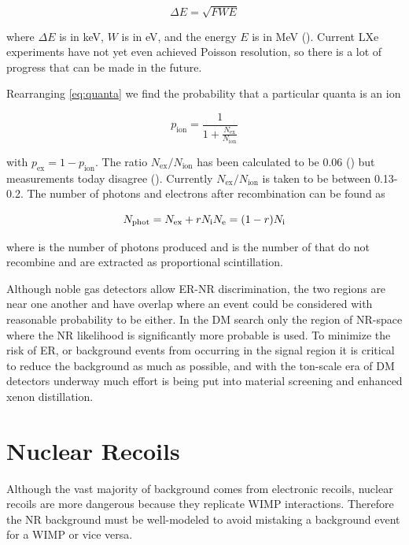 \begin{equation}
\Delta E = \sqrt{F W E}
\end{equation}

\noindent where $\Delta E$ is in keV, $W$ is in eV, and the energy $E$ is in MeV ().  Current LXe experiments have
not yet even achieved Poisson resolution, so there is a lot of progress that can be made in the future.

Rearranging \eqref{eq:quanta} we find the probability that a particular quanta is an ion

\begin{equation}
p_{\mathrm{ion}} = \frac{1}{1 + \frac{ N_{\mathrm{ex}} }{ N_{\mathrm{ion}} }}
\end{equation}

\noindent with $p_{\mathrm{ex}} = 1 - p_{\mathrm{ion}}$.  The ratio $N_{\mathrm{ex}} / N_{\mathrm{ion}}$ has been calculated to be
0.06 ()
but measurements today disagree ().  Currently $N_{\mathrm{ex}} / N_{\mathrm{ion}}$ is taken to be between
0.13-0.2.  The number of
photons and electrons after recombination can be found as

\begin{equation}
N_{\mathrm{phot}} = N_{\mathrm{ex}} + rN_{\mathrm{i}} \\
N_{\mathrm{e}} = (1 - r)N_{\mathrm{i}}
\end{equation}

\noindent where \nphot is the number of photons produced and \nelect is the number of \electron that do not recombine and are extracted as
proportional scintillation.

Although noble gas detectors allow ER-NR discrimination, the two regions are near one another and have overlap where an event could
be considered with reasonable probability to be either.  In the DM search only the region of NR-space where the NR likelihood is
significantly more probable is used.  To minimize the risk of ER, or background events from occurring in the signal region it is
critical to reduce the background as much as possible, and with the ton-scale era of DM detectors underway much effort is being put into
material screening and enhanced xenon distillation.


\section{Nuclear Recoils}
\label{sec:nr}
Although the vast majority of background comes from electronic recoils, nuclear recoils are more dangerous because they replicate
WIMP interactions.  Therefore the NR background must be well-modeled to avoid mistaking a background event for a WIMP or vice
versa.

